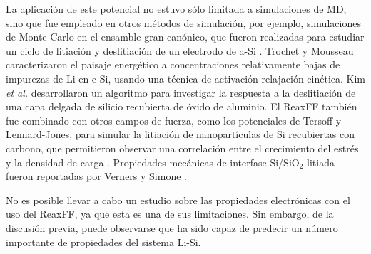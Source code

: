 La aplicación de este potencial no estuvo sólo limitada a simulaciones de MD, 
sino que fue empleado en otros métodos de simulación, por ejemplo, simulaciones 
de Monte Carlo en el ensamble gran canónico, que fueron realizadas para estudiar 
un ciclo de litiación y deslitiación de un electrodo de a-Si \cite{basu2019}. 
Trochet y Mousseau \cite{trochet2017} caracterizaron el paisaje energético a 
concentraciones relativamente bajas de impurezas de Li en c-Si, usando una 
técnica de activación-relajación cinética. Kim \textit{et al.} \cite{kim2017} 
desarrollaron un algoritmo para investigar la respuesta a la deslitiación de una 
capa delgada de silicio recubierta de óxido de aluminio. El ReaxFF también fue 
combinado con otros campos de fuerza, como los potenciales de Tersoff y 
Lennard-Jones, para simular la litiación de nanopartículas de Si recubiertas con 
carbono, que permitieron observar una correlación entre el crecimiento del 
estrés y la densidad de carga \cite{zheng2019,zheng2020}. Propiedades mecánicas 
de interfase Si/SiO$_2$ litiada fueron reportadas por Verners y 
Simone \cite{verners2019}. 

No es posible llevar a cabo un estudio sobre las propiedades electrónicas con el 
uso del ReaxFF, ya que esta es una de sus limitaciones. Sin embargo, de la 
discusión previa, puede observarse que ha sido capaz de predecir un número 
importante de propiedades del sistema Li-Si.
